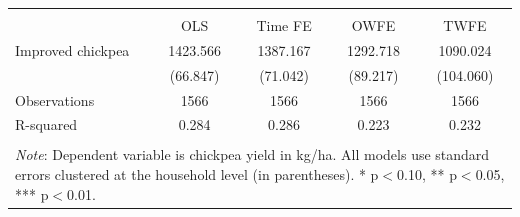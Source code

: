 \begin{tabular}{l*{4}{c}} 
\\[-1.8ex]\hline \hline \\[-1.8ex] 
& \multicolumn{1}{c}{OLS} & 
\multicolumn{1}{c}{Time FE} & 
\multicolumn{1}{c}{OWFE} & 
\multicolumn{1}{c}{TWFE} \\ \midrule
\midrule
Improved chickpea   &    1423.566\sym{***}&    1387.167\sym{***}&    1292.718\sym{***}&    1090.024\sym{***}\\
                    &    (66.847)         &    (71.042)         &    (89.217)         &   (104.060)         \\
\midrule
Observations        &        1566         &        1566         &        1566         &        1566         \\
R-squared           &       0.284         &       0.286         &       0.223         &       0.232         \\
\hline \hline \\[-1.8ex] 
\multicolumn{5}{p{\linewidth}}{\small 
\noindent \textit{Note}: Dependent variable 
is chickpea yield in kg/ha. All models use 
standard errors clustered at the 
household level (in parentheses). 
* p$<$0.10, ** p$<$0.05, *** p$<$0.01.} 
\end{tabular}
